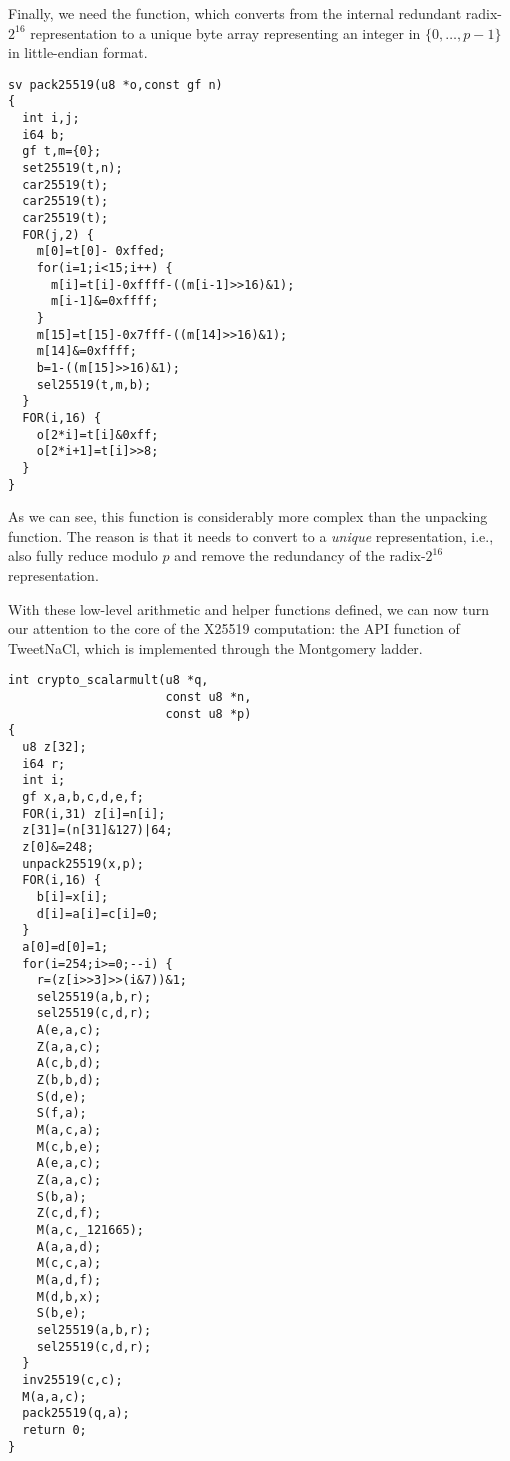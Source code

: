 Finally, we need the  function,
which converts from the internal redundant radix-$2^{16}$
representation to a unique byte array representing an
integer in $\{0,\dots,p-1\}$ in little-endian format.
\begin{lstlisting}[language=Ctweetnacl]
sv pack25519(u8 *o,const gf n)
{
  int i,j;
  i64 b;
  gf t,m={0};
  set25519(t,n);
  car25519(t);
  car25519(t);
  car25519(t);
  FOR(j,2) {
    m[0]=t[0]- 0xffed;
    for(i=1;i<15;i++) {
      m[i]=t[i]-0xffff-((m[i-1]>>16)&1);
      m[i-1]&=0xffff;
    }
    m[15]=t[15]-0x7fff-((m[14]>>16)&1);
    m[14]&=0xffff;
    b=1-((m[15]>>16)&1);
    sel25519(t,m,b);
  }
  FOR(i,16) {
    o[2*i]=t[i]&0xff;
    o[2*i+1]=t[i]>>8;
  }
}
\end{lstlisting}
As we can see, this function is considerably more complex than the
unpacking function. The reason is that it needs to convert
to a \emph{unique} representation, i.e., also fully reduce modulo
$p$ and remove the redundancy of the radix-$2^{16}$ representation.

With these low-level arithmetic and helper functions defined,
we can now turn our attention to the core of the X25519 computation:
the  API function of TweetNaCl,
which is implemented through the Montgomery ladder.

\begin{lstlisting}[language=Ctweetnacl]
int crypto_scalarmult(u8 *q,
                      const u8 *n,
                      const u8 *p)
{
  u8 z[32];
  i64 r;
  int i;
  gf x,a,b,c,d,e,f;
  FOR(i,31) z[i]=n[i];
  z[31]=(n[31]&127)|64;
  z[0]&=248;
  unpack25519(x,p);
  FOR(i,16) {
    b[i]=x[i];
    d[i]=a[i]=c[i]=0;
  }
  a[0]=d[0]=1;
  for(i=254;i>=0;--i) {
    r=(z[i>>3]>>(i&7))&1;
    sel25519(a,b,r);
    sel25519(c,d,r);
    A(e,a,c);
    Z(a,a,c);
    A(c,b,d);
    Z(b,b,d);
    S(d,e);
    S(f,a);
    M(a,c,a);
    M(c,b,e);
    A(e,a,c);
    Z(a,a,c);
    S(b,a);
    Z(c,d,f);
    M(a,c,_121665);
    A(a,a,d);
    M(c,c,a);
    M(a,d,f);
    M(d,b,x);
    S(b,e);
    sel25519(a,b,r);
    sel25519(c,d,r);
  }
  inv25519(c,c);
  M(a,a,c);
  pack25519(q,a);
  return 0;
}
\end{lstlisting}
